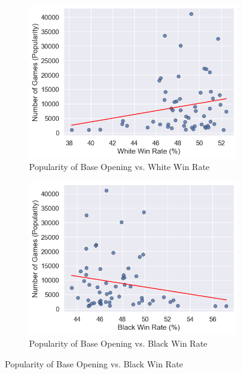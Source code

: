 \documentclass[a4paper, 11pt]{article}
\begin{document}
\begin{figure}[H]
    \centering
    \caption{Popularity of Base Opening vs. Win Rates (Players Rated 1200 and Below)}
    \label{fig:popularityOfBaseOpeningVsWinRatesLowRatedPlayers}
    \begin{subfigure}{0.49\textwidth}
        \centering
        \caption{Popularity of Base Opening vs. White Win Rate}
        \label{fig:popularityOfBaseOpeningVsWhiteWinRateLowRatedPlayers}
        \includegraphics[width=\textwidth]{Popularity of Base Opening vs. White Win Rate (Rated 1200-).png}
    \end{subfigure}
    \hfill
    \begin{subfigure}{0.49\textwidth}
        \centering
        \caption{Popularity of Base Opening vs. Black Win Rate}
        \label{fig:popularityOfBaseOpeningVsBlackWinRateLowRatedPlayers}
        \includegraphics[width=\textwidth]{Popularity of Base Opening vs. Black Win Rate (Rated 1200-).png}
    \end{subfigure}
\end{figure}
\end{document}
